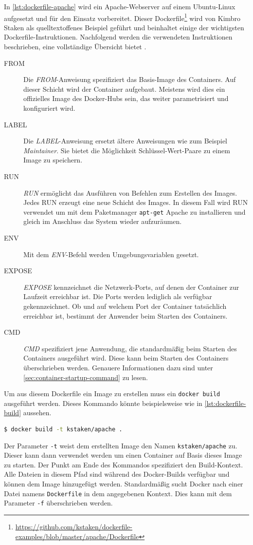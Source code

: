 
In \cref{lst:dockerfile-apache} wird ein Apache-Webserver auf einem Ubuntu-Linux aufgesetzt und für den Einsatz vorbereitet.
Dieser Dockerfile\footnote{\url{https://github.com/kstaken/dockerfile-examples/blob/master/apache/Dockerfile}} wird von Kimbro Staken als quelltextoffenes Beispiel geführt und beinhaltet einige der wichtigsten Dockerfile-Instruktionen.
Nachfolgend werden die verwendeten Instruktionen beschrieben, eine vollständige Übersicht bietet \autocite{docker-dockerfile:online}.
\begin{description}
    \item[FROM] Die \emph{FROM}-Anweisung spezifiziert das Basis-Image des Containers. Auf dieser Schicht wird der Container aufgebaut. Meistens wird dies ein offizielles Image des Docker-Hubs sein, das weiter parametrisiert und konfiguriert wird.
    \item[LABEL] Die \emph{LABEL}-Anweisung ersetzt ältere Anweisungen wie zum Beispiel \emph{Maintainer}. Sie bietet die Möglichkeit Schlüssel-Wert-Paare zu einem Image zu speichern.
    \item[RUN] \emph{RUN} ermöglicht das Ausführen von Befehlen zum Erstellen des Images. Jedes RUN erzeugt eine neue Schicht des Images. In diesem Fall wird RUN verwendet um mit dem Paketmanager \texttt{apt-get} Apache zu installieren und gleich im Anschluss das System wieder aufzuräumen.
    \item[ENV] Mit dem \emph{ENV}-Befehl werden Umgebungsvariablen gesetzt.
    \item[EXPOSE] \emph{EXPOSE} kennzeichnet die Netzwerk-Ports, auf denen der Container zur Laufzeit erreichbar ist. Die Ports werden lediglich als verfügbar gekennzeichnet. Ob und auf welchem Port der Container tatsächlich erreichbar ist, bestimmt der Anwender beim Starten des Containers.
    \item[CMD] \emph{CMD} spezifiziert jene Anwendung, die standardmäßig beim Starten des Containers ausgeführt wird. Diese kann beim Starten des Containers überschrieben werden. Genauere Informationen dazu sind unter \cref{sec:container-startup-command} zu lesen.
\end{description}

Um aus diesem Dockerfile ein Image zu erstellen muss ein \texttt{docker build} ausgeführt werden.
Dieses Kommando könnte beispielsweise wie in \cref{lst:dockerfile-build} aussehen.

\begin{lstlisting}[caption=Erstellen eines Images auf Basis eines Dockerfiles, language=bash, label=lst:dockerfile-build]
    $ docker build -t kstaken/apache .
\end{lstlisting}
Der Parameter \texttt{-t} weist dem erstellten Image den Namen \texttt{kstaken/apache} zu.
Dieser kann dann verwendet werden um einen Container auf Basis dieses Image zu starten.
Der Punkt am Ende des Kommandos spezifiziert den Build-Kontext.
Alle Dateien in diesem Pfad sind während des Docker-Builds verfügbar und können dem Image hinzugefügt werden.
Standardmäßig sucht Docker nach einer Datei namens \texttt{Dockerfile} in dem angegebenen Kontext.
Dies kann mit dem Parameter \texttt{-f} überschrieben werden.


